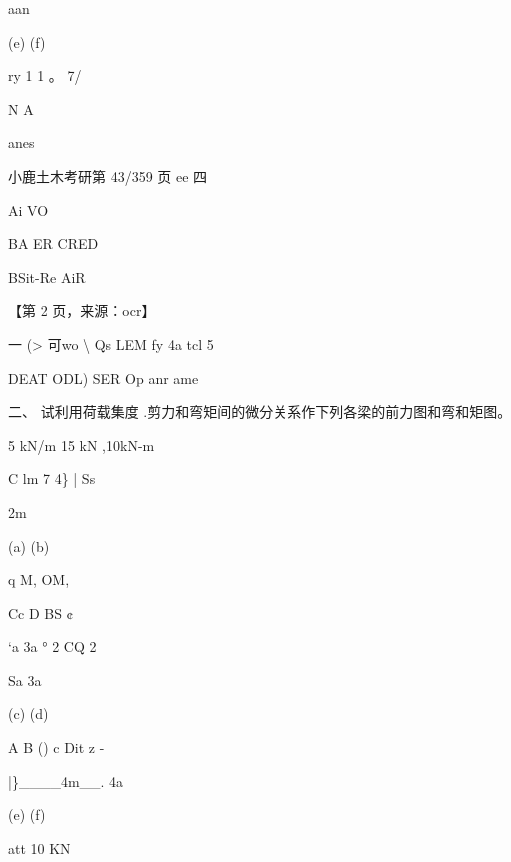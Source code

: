 \documentclass[UTF8,12pt,a4paper,openany]{ctexbook}
\begin{document}
\begin{enumerate}[label=\textbf{\arabic*.},leftmargin=2em]
 aan\par (e)                         (f)\par ry 1 1 。 7/\par N  A\par anes\par 小鹿土木考研第 43/359 页                            ee 四\par Ai VO\par BA ER CRED\par BSit-Re AiR\par \par 【第 2 页，来源：ocr】\par 一 (>  可wo    \textbackslash{} Qs LEM fy 4a tcl 5\par DEAT ODL) SER Op anr ame\par 二、 试利用荷载集度 .剪力和弯矩间的微分关系作下列各梁的前力图和弯和矩图。\par 5 kN/m               15 kN ,10kN-m\par C     lm    7     4\}            | Ss\par 2m\par (a)                           (b)\par q                     M,                 OM,\par Cc          D            BS                ¢\par ‘a     3a         °      2 CQ              2\par Sa                             3a\par (c)                           (d)\par A                       B      ()    c    Dit    z   -\par |\}\_\_\_\_4m\_\_.                  4a\par (e)                           (f)\par att                 10 KN
\end{enumerate}
\end{document}

